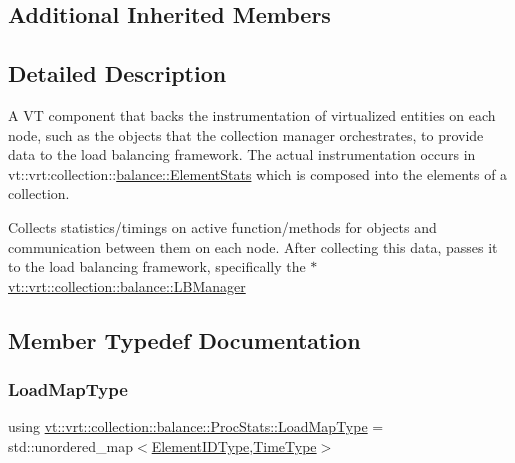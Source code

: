 \subsection*{Additional Inherited Members}


\subsection{Detailed Description}
A VT component that backs the instrumentation of virtualized entities on each node, such as the objects that the collection manager orchestrates, to provide data to the load balancing framework. The actual instrumentation occurs in {\ttfamily vt\+::vrt\+:collection\+:}\+:\hyperlink{structvt_1_1vrt_1_1collection_1_1balance_1_1_element_stats}{balance\+::\+Element\+Stats} which is composed into the elements of a collection. 

Collects statistics/timings on active function/methods for objects and communication between them on each node. After collecting this data, passes it to the load balancing framework, specifically the {\ttfamily $\ast$} \hyperlink{structvt_1_1vrt_1_1collection_1_1balance_1_1_l_b_manager}{vt\+::vrt\+::collection\+::balance\+::\+L\+B\+Manager} 

\subsection{Member Typedef Documentation}
\mbox{\label{structvt_1_1vrt_1_1collection_1_1balance_1_1_proc_stats_aa810fd21680061ec5d50f6526f66be31}} 
\subsubsection{\texorpdfstring{Load\+Map\+Type}{LoadMapType}}
{\footnotesize\ttfamily using \hyperlink{structvt_1_1vrt_1_1collection_1_1balance_1_1_proc_stats_aa810fd21680061ec5d50f6526f66be31}{vt\+::vrt\+::collection\+::balance\+::\+Proc\+Stats\+::\+Load\+Map\+Type} =  std\+::unordered\+\_\+map$<$\hyperlink{namespacevt_1_1vrt_1_1collection_1_1balance_a14c8d2c972f2913aa3f1636e5be0a120}{Element\+I\+D\+Type},\hyperlink{namespacevt_a876a9d0cd5a952859c72de8a46881442}{Time\+Type}$>$}

